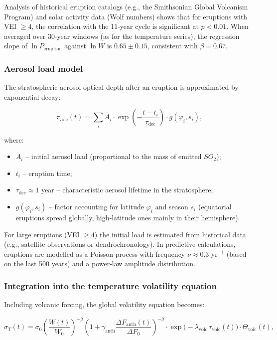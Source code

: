 \documentclass[12pt,a4paper]{article}
\begin{document}
	Analysis of historical eruption catalogs (e.g., the Smithsonian Global Volcanism Program) and solar activity data (Wolf numbers) shows that for eruptions with VEI \(\ge 4\), the correlation with the 11‑year cycle is significant at \(p < 0.01\). When averaged over 30‑year windows (as for the temperature series), the regression slope of \(\ln P_{\text{eruption}}\) against \(\ln W\) is \(0.65 \pm 0.15\), consistent with \(\beta = 0.67\).
	
	\subsubsection{Aerosol load model}
	
	The stratospheric aerosol optical depth after an eruption is approximated by exponential decay:
	
	\[
	\tau_{\text{volc}}(t) = \sum_{i} A_i \cdot \exp\!\left(-\frac{t-t_i}{\tau_{\text{dec}}}\right) \cdot g(\varphi_i, s_i),
	\]
	
	where:
	\begin{itemize}
		\item \(A_i\) – initial aerosol load (proportional to the mass of emitted \(SO_2\));
		\item \(t_i\) – eruption time;
		\item \(\tau_{\text{dec}} \approx 1\) year – characteristic aerosol lifetime in the stratosphere;
		\item \(g(\varphi_i, s_i)\) – factor accounting for latitude \(\varphi_i\) and season \(s_i\) (equatorial eruptions spread globally, high‑latitude ones mainly in their hemisphere).
	\end{itemize}
	
	For large eruptions (VEI \(\ge 4\)) the initial load is estimated from historical data (e.g., satellite observations or dendrochronology). In predictive calculations, eruptions are modelled as a Poisson process with frequency \(\nu \approx 0.3\) yr\(^{-1}\) (based on the last 500 years) and a power‑law amplitude distribution.
	
	\subsubsection{Integration into the temperature volatility equation}
	
	Including volcanic forcing, the global volatility equation becomes:
	
	\[
	\sigma_T(t) = \sigma_0 \left( \frac{W(t)}{W_0} \right)^{-\beta}
	\left(1 + \gamma_{\text{anth}} \frac{\Delta F_{\text{anth}}(t)}{\Delta F_0}\right)^{-\beta}
	\cdot \exp\!\bigl(-\lambda_{\text{volc}} \,\tau_{\text{volc}}(t)\bigr) \cdot \Theta_{\text{volc}}(t),
	\]
	
\end{document}
